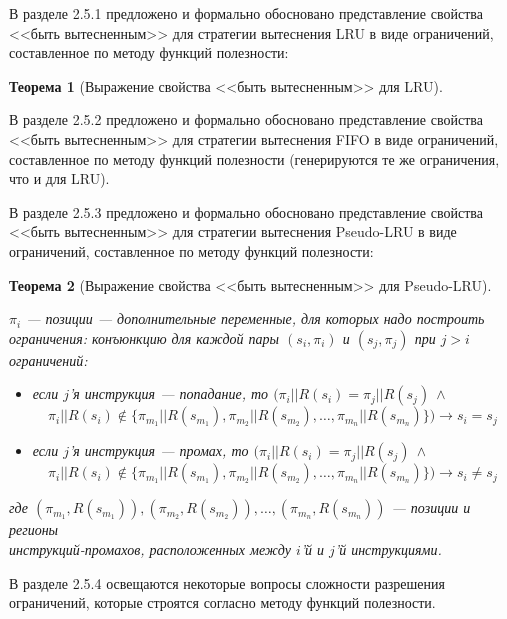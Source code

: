 \documentclass[14pt,autoref,href
,facsimile
]{disser}
\newtheorem{theorem}{Теорема}
\newcommand{\LRU}{LRU\xspace}
\newcommand{\PseudoLRU}{Pseudo-LRU\xspace}
\begin{document}
В разделе 2.5.1 предложено и формально обосновано представление свойства <<быть вытесненным>> для стратегии вытеснения LRU в виде ограничений, составленное по методу функций полезности:
\begin{theorem}[Выражение свойства <<быть вытесненным>> для \LRU]\label{correct_mirror_LRU} \LRUusefuls
\end{theorem}

В разделе 2.5.2 предложено и формально обосновано представление свойства <<быть вытесненным>> для стратегии вытеснения FIFO  в виде ограничений, составленное по методу функций полезности (генерируются те же ограничения, что и для LRU).

В разделе 2.5.3 предложено и формально обосновано представление свойства <<быть вытесненным>> для стратегии вытеснения Pseudo-LRU в виде ограничений, составленное по методу функций полезности:
\begin{theorem}[Выражение свойства <<быть вытесненным>> для \PseudoLRU]\label{correct_mirror_PLRU} \PLRUusefuls

$\pi_i$ --- позиции --- дополнительные переменные, для которых надо построить ограничения:
конъюнкцию для каждой пары $(s_i,\pi_i)$ и $(s_j, \pi_j)$ при $j > i$ ограничений:
\begin{itemize}
    \item если $j$'я инструкция --- попадание, то $(\pi_i||R(s_i) =
\pi_j||R(s_j)~\wedge$ $$\pi_i||R(s_i) \notin \{\pi_{m_1}||R(s_{m_1}),
\pi_{m_2}||R(s_{m_2}), \dots, \pi_{m_n}||R(s_{m_n})\}) \rightarrow s_i = s_j$$
    \item если $j$'я инструкция --- промах, то $(\pi_i||R(s_i) =
\pi_j||R(s_j)~\wedge$ $$\pi_i||R(s_i) \notin \{\pi_{m_1}||R(s_{m_1}),
\pi_{m_2}||R(s_{m_2}), \dots, \pi_{m_n}||R(s_{m_n})\}) \rightarrow s_i \neq
s_j$$
\end{itemize}
где $(\pi_{m_1},R(s_{m_1})), (\pi_{m_2},R(s_{m_2})), \dots,
(\pi_{m_n},R(s_{m_n}))$ --- позиции и регионы\\инструкций-промахов,
расположенных между $i$'й и $j$'й инструкциями.
\end{theorem}

В разделе 2.5.4 освещаются некоторые вопросы сложности разрешения ограничений, которые строятся согласно методу функций полезности.
\end{document}
